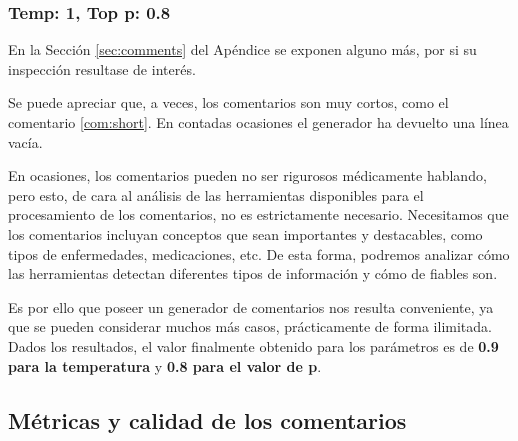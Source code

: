 \subsubsection{Temp: 1, Top p: 0.8}
\begin{thm}
\end{thm}
\begin{thm}
\end{thm}

En la Sección \ref{sec:comments} del Apéndice se exponen alguno más, por si su inspección resultase de interés. 

Se puede apreciar que, a veces, los comentarios son muy cortos, como el comentario \ref{com:short}. En contadas ocasiones el generador ha devuelto una línea vacía. 

En ocasiones, los comentarios pueden no ser rigurosos médicamente hablando, pero esto, de cara al análisis de las herramientas disponibles para el procesamiento de los comentarios, no es estrictamente necesario. Necesitamos que los comentarios incluyan conceptos que sean importantes y destacables, como tipos de enfermedades, medicaciones, etc. De esta forma, podremos analizar cómo las herramientas detectan diferentes tipos de información y cómo de fiables son. 

Es por ello que poseer un generador de comentarios nos resulta conveniente, ya que se pueden considerar muchos más casos, prácticamente de forma ilimitada. Dados los resultados, el valor finalmente obtenido para los parámetros es de \textbf{0.9 para la temperatura} y \textbf{0.8 para el valor de p}.

\subsection{Métricas y calidad de los comentarios}


